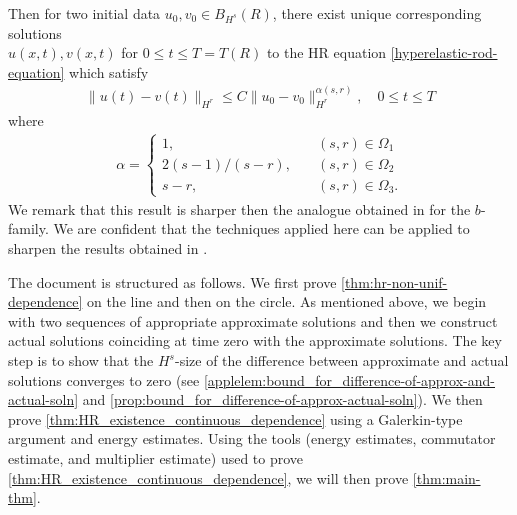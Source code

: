 %
%
Then for two initial data $u_{0}, v_{0} \in B_{H^{s}}(R)$, there exist unique
corresponding solutions \\ $u(x,t), v(x,t)$ for $0 \le t \le T= T(R)$ to the
HR equation \eqref{hyperelastic-rod-equation} which satisfy 
%
%
\begin{equation*}
\begin{split}
\| u(t) - v(t) \|_{H^{r}} \le C \| u_{0} - v_{0} \|_{H^{r}}^{\alpha(s, r)},
\quad 0
\le t \le T
\end{split}
\end{equation*}
%
%
where 
%
%
\begin{equation*}
\begin{split}
\alpha = 
\begin{cases}
1, \quad & (s,r) \in \Omega_{1} 
\\
2(s-1)/(s-r),  \quad & (s, r) \in \Omega_{2}
\\
s-r, \quad & (s, r) \in \Omega_{3}.
\end{cases}
\end{split}
\end{equation*}
%
%
%
%
%
%
%
%
We remark that this result is sharper then the analogue obtained in
\cite{Chen:2011fk} for the $b$-family. We are confident that the techniques
applied here can be applied to sharpen the results obtained in
\cite{Chen:2011fk}.

The document is structured as follows. We first prove 
\cref{thm:hr-non-unif-dependence} on the line and 
then on the circle.
As mentioned above, we begin with two sequences of
appropriate approximate solutions and then 
we construct  actual solutions
coinciding at time zero  with the approximate solutions.
The key step is to show that  the $H^s$-size of
the difference between approximate and actual solutions 
converges to zero (see \cref{applelem:bound_for_difference-of-approx-and-actual-soln}
and \cref{prop:bound_for_difference-of-approx-actual-soln}). 
We then prove \cref{thm:HR_existence_continuous_dependence} 
using a Galerkin-type argument and energy estimates. Using the tools (energy estimates, commutator estimate, and multiplier estimate) used to prove \cref{thm:HR_existence_continuous_dependence}, we will then prove \cref{thm:main-thm}. 
%
%
%	
%
%
%
%
%
%
%
%
%
%
%
